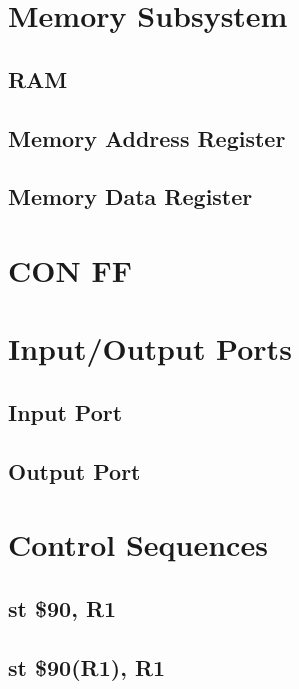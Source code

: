 \documentclass{article}
\begin{document}
\section{Memory Subsystem}
    \subsection{RAM} \label{ram.v}
         
    \subsection{Memory Address Register} \label{MAR.v}
        
    \subsection{Memory Data Register} \label{MDR.v}
         
\section{CON FF} \label{con_ff.v}
     
\section{Input/Output Ports}
    \subsection{Input Port} \label{inputPort.v}
        
    \subsection{Output Port} \label{outputPort.v}
        
    
\section{Control Sequences}
    \subsection{st \$90, R1} \label{st_case_1_sequence}
        
    \subsection{st \$90(R1), R1} \label{st_case_2_sequence}
        
\end{document}
